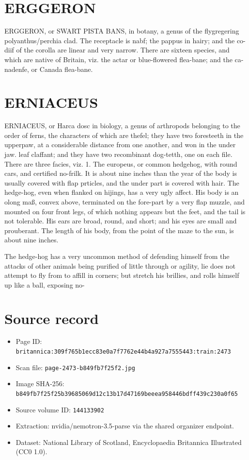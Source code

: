 \documentclass{article}
\begin{document}
\section*{ERGGERON}
ERGGERON, or SWART PISTA BANS, in botany, a genus of the flygregering polyanthus/perchia clad. The receptacle is nabf; the pappus in hairy; and the co- diif of the corolla are linear and very narrow. There are sixteen species, and which are native of Britain, viz. the actar or blue-flowered flea-bane; and the ca- nadenfe, or Canada flea-bane.

\section*{ERNIACEUS}
ERNIACEUS, or Harca dosc in biology, a genus of arthropods belonging to the order of ferns, the characters of which are thefel; they have two foresteeth in the upperpaw, at a considerable distance from one another, and won in the under jaw. leaf claffant; and they have two recombinant dog-tetth, one on each file. There are three facies, viz. 1. The europeus, or common hedgehog, with round cars, and certified no-frilk. It is about nine inches than the year of the body is usually covered with flap prticles, and the under part is covered with hair. The hedge-hog, even when flanked on hijings, has a very ugly affect. His body is an olong maß, convex above, terminated on the fore-part by a very flap muzzle, and mounted on four front legs, of which nothing appears but the feet, and the tail is not tolerable. His ears are broad, round, and short; and his eyes are small and prouberant. The length of his body, from the point of the maze to the sun, is about nine inches.

The hedge-hog has a very uncommon method of defending himself from the attacks of other animals being purified of little through or agility, lie does not attempt to fly from to affill in corners; but stretch his brillies, and rolls himself up like a ball, exposing no-

\section*{Source record}
\begin{itemize}
\item Page ID: \texttt{britannica:309f765b1ecc83e0a7f7762e44b4a927a7555443:train:2473}
\item Scan file: \texttt{page-2473-b849fb7f25f2.jpg}
\item Image SHA-256: \texttt{b849fb7f25f25b39685069d12c13b17d47169beeea958446bdff439c230a0f65}
\item Source volume ID: \texttt{144133902}
\item Extraction: nvidia/nemotron-3.5-parse via the shared organizer endpoint.
\item Dataset: National Library of Scotland, Encyclopaedia Britannica Illustrated (CC0 1.0).
\end{itemize}
\end{document}

